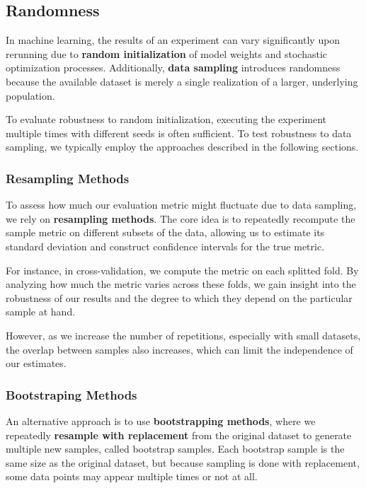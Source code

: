\subsection{Randomness}
In machine learning, the results of an experiment can vary significantly upon rerunning due to \textbf{random initialization} 
of model weights and stochastic optimization processes. 
Additionally, \textbf{data sampling} introduces randomness because the available dataset is merely a single realization of a larger, underlying population.

To evaluate robustness to random initialization, executing the experiment multiple times with different seeds is often sufficient. 
To test robustness to data sampling, we typically employ the approaches described in the following sections.

\subsubsection*{Resampling Methods}
To assess how much our evaluation metric might fluctuate due to data sampling, we rely on \textbf{resampling methods}.
The core idea is to repeatedly recompute the sample metric on different subsets of the data, allowing us to estimate its standard deviation and construct confidence intervals for the true metric.

For instance, in cross-validation, we compute the metric on each splitted fold.
By analyzing how much the metric varies across these folds, we gain insight into the robustness of our results and the degree to which they depend on the particular sample at hand.

However, as we increase the number of repetitions, especially with small datasets, the overlap between samples also increases, which can limit the independence of our estimates.

\subsubsection*{Bootstraping Methods}
An alternative approach is to use \textbf{bootstrapping methods}, where we repeatedly \textbf{resample with replacement} from the original dataset to generate multiple new samples, called bootstrap samples.
Each bootstrap sample is the same size as the original dataset, but because sampling is done with replacement, some data points may appear multiple times or not at all.

